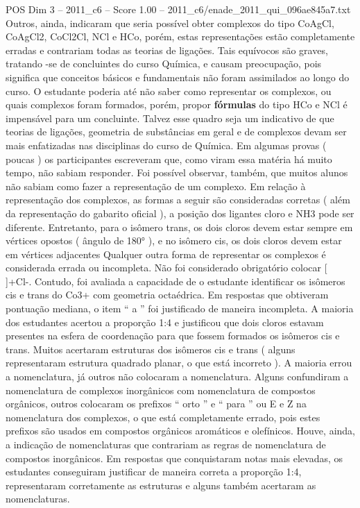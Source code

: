 \begin{textsample}{POS Dim 3 – 2011\_c6 – Score 1.00 – 2011\_c6/enade\_2011\_qui\_096ae845a7.txt}
Outros, ainda, indicaram que seria possível obter complexos do tipo CoAgCl, CoAgCl2, CoCl2Cl, NCl e HCo, porém, estas representações estão completamente erradas e contrariam todas as teorias de ligações.
Tais equívocos são graves, tratando -se de concluintes do curso Química, e causam preocupação, pois significa que conceitos básicos e fundamentais não foram assimilados ao longo do curso.
O estudante poderia até não saber como representar os complexos, ou quais complexos foram formados, porém, propor \textbf{fórmulas} do tipo HCo e NCl é impensável para um concluinte.
Talvez esse quadro seja um indicativo de que teorias de ligações, geometria de substâncias em geral e de complexos devam ser mais enfatizadas nas disciplinas do curso de Química.
Em algumas provas ( poucas ) os participantes escreveram que, como viram essa matéria há muito tempo, não sabiam responder.
Foi possível observar, também, que muitos alunos não sabiam como fazer a representação de um complexo.
Em relação à representação dos complexos, as formas a seguir são consideradas corretas ( além da representação do gabarito oficial ), a posição dos ligantes cloro e NH3 pode ser diferente.
Entretanto, para o isômero trans, os dois cloros devem estar sempre em vértices opostos ( ângulo de 180{\EmojiFont °} ), e no isômero cis, os dois cloros devem estar em vértices adjacentes Qualquer outra forma de representar os complexos é considerada errada ou incompleta.
Não foi considerado obrigatório colocar [ ]+Cl-.
Contudo, foi avaliada a capacidade de o estudante identificar os isômeros cis e trans do Co3+ com geometria octaédrica.
Em respostas que obtiveram pontuação mediana, o item “ a ” foi justificado de maneira incompleta.
A maioria dos estudantes acertou a proporção 1:4 e justificou que dois cloros estavam presentes na esfera de coordenação para que fossem formados os isômeros cis e trans.
Muitos acertaram estruturas dos isômeros cis e trans ( alguns representaram estrutura quadrado planar, o que está incorreto ).
A maioria errou a nomenclatura, já outros não colocaram a nomenclatura.
Alguns confundiram a nomenclatura de complexos inorgânicos com nomenclatura de compostos orgânicos, outros colocaram os prefixos “ orto ” e “ para ” ou E e Z na nomenclatura dos complexos, o que está completamente errado, pois estes prefixos são usados em compostos orgânicos aromáticos e olefínicos.
Houve, ainda, a indicação de nomenclaturas que contrariam as regras de nomenclatura de compostos inorgânicos.
Em respostas que conquistaram notas mais elevadas, os estudantes conseguiram justificar de maneira correta a proporção 1:4, representaram corretamente as estruturas e alguns também acertaram as nomenclaturas.

\end{textsample}
